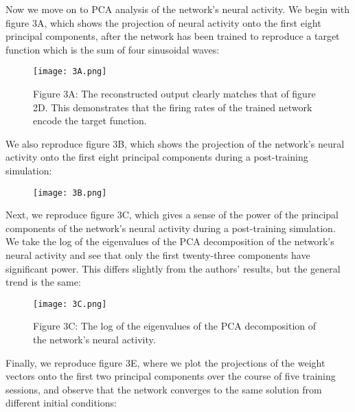 \documentclass{article}
\begin{document}

\FloatBarrier
Now we move on to PCA analysis of the network's neural activity. We begin with figure 3A, which shows the projection of neural activity onto the first eight principal components, after the network has been trained to reproduce a target function which is the sum of four sinusoidal waves:

\begin{figure}[ht]
    \centering
    \texttt{[image: 3A.png]}
    \captionsetup{font=normalsize, width=1\textwidth, labelformat=empty}
    \caption{Figure 3A: The reconstructed output clearly matches that of figure 2D. This demonstrates that the firing rates of the trained network encode the target function.}
\end{figure}

\newpage
We also reproduce figure 3B, which shows the projection of the network's neural activity onto the first eight principal components during a post-training simulation:

\begin{figure}[ht]
    \centering
    \texttt{[image: 3B.png]}
\end{figure}
\vspace{1em}

Next, we reproduce figure 3C, which gives a sense of the power of the principal components of the network's neural activity during a post-training simulation. We take the log of the eigenvalues of the PCA decomposition of the network's neural activity and see that only the first twenty-three components have significant power. This differs slightly from the authors' results, but the general trend is the same:

\begin{figure}[ht]
    \centering
    \texttt{[image: 3C.png]}
    \captionsetup{font=normalsize, width=1\textwidth, labelformat=empty}
    \caption{Figure 3C: The log of the eigenvalues of the PCA decomposition of the network's neural activity.}
\end{figure}

\newpage
Finally, we reproduce figure 3E, where we plot the projections of the weight vectors onto the first two principal components over the course of five training sessions, and observe that the network converges to the same solution from different initial conditions:
\end{document}
